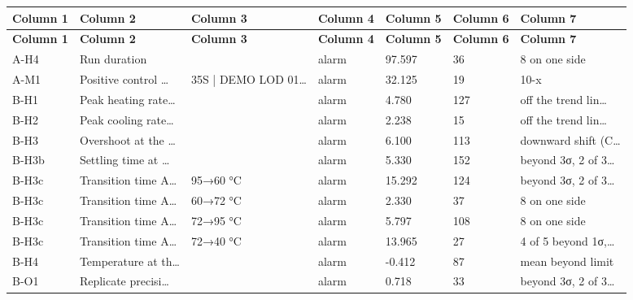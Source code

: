 {\footnotesize
\begin{longtable}{@{}lllllll@{}}
\toprule \textbf{Column 1} & \textbf{Column 2} & \textbf{Column 3} & \textbf{Column 4} & \textbf{Column 5} & \textbf{Column 6} & \textbf{Column 7} \\\midrule\endfirsthead
\toprule \textbf{Column 1} & \textbf{Column 2} & \textbf{Column 3} & \textbf{Column 4} & \textbf{Column 5} & \textbf{Column 6} & \textbf{Column 7} \\\midrule\endhead
A-H4 & Run duration &  & alarm & 97.597 & 36 & 8 on one side \\\hline
A-M1 & Positive control … & 35S | DEMO LOD 01… & alarm & 32.125 & 19 & 10-x \\\hline
B-H1 & Peak heating rate… &  & alarm & 4.780 & 127 & off the trend lin… \\\hline
B-H2 & Peak cooling rate… &  & alarm & 2.238 & 15 & off the trend lin… \\\hline
B-H3 & Overshoot at the … &  & alarm & 6.100 & 113 & downward shift (C… \\\hline
B-H3b & Settling time at … &  & alarm & 5.330 & 152 & beyond 3σ, 2 of 3… \\\hline
B-H3c & Transition time A… & 95→60 °C & alarm & 15.292 & 124 & beyond 3σ, 2 of 3… \\\hline
B-H3c & Transition time A… & 60→72 °C & alarm & 2.330 & 37 & 8 on one side \\\hline
B-H3c & Transition time A… & 72→95 °C & alarm & 5.797 & 108 & 8 on one side \\\hline
B-H3c & Transition time A… & 72→40 °C & alarm & 13.965 & 27 & 4 of 5 beyond 1σ,… \\\hline
B-H4 & Temperature at th… &  & alarm & -0.412 & 87 & mean beyond limit \\\hline
B-O1 & Replicate precisi… &  & alarm & 0.718 & 33 & beyond 3σ, 2 of 3… \\\hline
\bottomrule
\end{longtable}}

